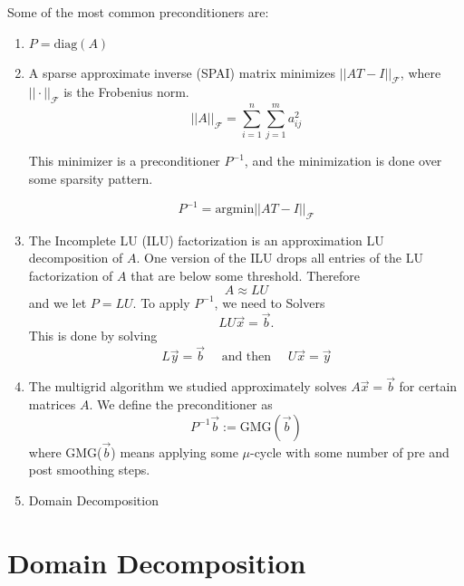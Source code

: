 Some of the most common preconditioners are:
\begin{enumerate}[1)]
    \item $P = \text{diag}(A)$
    \item A sparse approximate inverse (SPAI) matrix minimizes $||AT-I||_{\mathcal{F}}$, where $||\cdot||_{\mathcal{F}}$ is the Frobenius norm.
    \begin{equation*}
        ||A||_{\mathcal{F}} = \sum_{i=1}^{n}\sum_{j=1}^{m}a_{ij}^2
    \end{equation*}

This minimizer is a preconditioner $P^{-1}$, and the minimization is done over some sparsity pattern.

\begin{equation*}
    P^{-1} = \text{argmin}||AT-I||_{\mathcal{F}}
\end{equation*}

\item The Incomplete LU (ILU) factorization is an approximation LU decomposition of $A$. One version of the ILU drops all entries of the LU factorization of $A$ that are below some threshold. Therefore
\begin{equation*}
    A \approx LU
\end{equation*}
and we let $P=LU$. To apply $P^{-1}$, we need to Solvers
\begin{equation*}
    LU \vec{x} = \vec{b}.
\end{equation*}
This is done by solving
\begin{equation*}
    L\vec{y}=\vec{b} \quad \text{ and then } \quad U\vec{x} = \vec{y}
\end{equation*}
\item The multigrid algorithm we studied approximately solves $A\vec{x} = \vec{b}$ for certain matrices $A$.
We define the preconditioner as
\begin{equation*}
    P^{-1}\vec{b} := \text{GMG}(\vec{b})
\end{equation*}
where GMG($\vec{b}$) means applying some $\mu$-cycle with
some number of pre and post smoothing steps.

\item Domain Decomposition

\end{enumerate}

\section*{Domain Decomposition}

